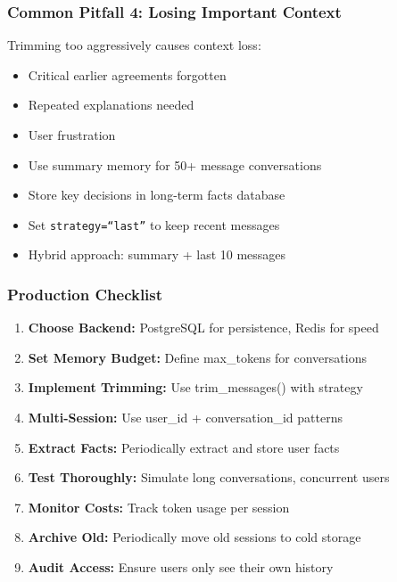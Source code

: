 \documentclass[aspectratio=169,11pt]{beamer}
\begin{document}
\begin{frame}
  \frametitle{Common Pitfall 4: Losing Important Context}
  \begin{warningbox}[Issue]
    Trimming too aggressively causes context loss:
    \begin{itemize}
      \item Critical earlier agreements forgotten
      \item Repeated explanations needed
      \item User frustration
    \end{itemize}
  \end{warningbox}
  \vspace{0.6em}
  \begin{tipbox}
    \begin{itemize}
      \item Use summary memory for 50+ message conversations
      \item Store key decisions in long-term facts database
      \item Set \texttt{strategy=``last''} to keep recent messages
      \item Hybrid approach: summary + last 10 messages
    \end{itemize}
  \end{tipbox}
\end{frame}

\begin{frame}
  \frametitle{Production Checklist}
  \begin{enumerate}
    \item \textbf{Choose Backend:} PostgreSQL for persistence, Redis for speed
    \item \textbf{Set Memory Budget:} Define max\_tokens for conversations
    \item \textbf{Implement Trimming:} Use trim\_messages() with strategy
    \item \textbf{Multi-Session:} Use user\_id + conversation\_id patterns
    \item \textbf{Extract Facts:} Periodically extract and store user facts
    \item \textbf{Test Thoroughly:} Simulate long conversations, concurrent users
    \item \textbf{Monitor Costs:} Track token usage per session
    \item \textbf{Archive Old:} Periodically move old sessions to cold storage
    \item \textbf{Audit Access:} Ensure users only see their own history
  \end{enumerate}
\end{frame}
\end{document}
